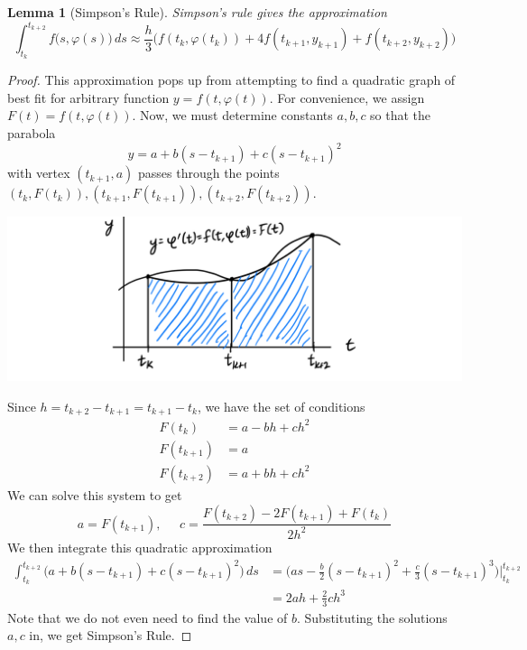 \documentclass{article}
\newtheorem{lemma}[theorem]{Lemma}
\theoremstyle{remark}
\theoremstyle{definition}
\begin{document}
    \begin{lemma}[Simpson's Rule]
    \textit{Simpson's rule} gives the approximation 
    \[\int_{t_k}^{t_{k+2}} f\big(s, \varphi(s)\big)\,ds \approx \frac{h}{3} \big( f(t_k, \varphi(t_k)) + 4 f (t_{k+1}, y_{k+1}) + f(t_{k+2}, y_{k+2})\big)\]
    \end{lemma}
    \begin{proof}
    This approximation pops up from attempting to find a quadratic graph of best fit for arbitrary function $y = f(t, \varphi(t))$. For convenience, we assign $F(t) = f(t, \varphi(t))$. Now, we must determine constants $a, b, c$ so that the parabola
    \[y = a + b(s - t_{k+1}) + c(s - t_{k+1})^2\]
    with vertex $(t_{k+1}, a)$ passes through the points $(t_k, F(t_k)), (t_{k+1}, F(t_{k+1})), (t_{k+2}, F(t_{k+2}))$. 
    \begin{center}
        \includegraphics[scale=0.27]{img/Quadratic_Milne.PNG}
    \end{center}
    Since $h = t_{k+2} - t_{k+1} = t_{k+1} - t_k$, we have the set of conditions
    \begin{align*}
        F(t_k) & = a - bh + ch^2 \\
        F(t_{k+1}) & = a \\
        F(t_{k+2}) & = a + bh + ch^2
    \end{align*}
    We can solve this system to get
    \[a = F(t_{k+1}), \;\;\;\;\; c = \frac{F(t_{k+2}) - 2 F (t_{k+1}) + F(t_k)}{2 h^2}\]
    We then integrate this quadratic approximation
    \begin{align*}
        \int_{t_k}^{t_{k+2}} \big( a + b(s - t_{k+1}) + c(s - t_{k+1})^2 \big) \,ds & = \bigg( as - \frac{b}{2} (s - t_{k+1})^2 + \frac{c}{3} (s - t_{k+1})^3 \bigg) \bigg|^{t_{k+2}}_{t_k} \\
        & = 2 ah + \frac{2}{3} ch^3
    \end{align*}
    Note that we do not even need to find the value of $b$. Substituting the solutions $a, c$ in, we get Simpson's Rule. 
    \end{proof}
\end{document}
